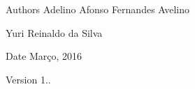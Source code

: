 \begin{DoxyAuthor}{Authors}
Adelino Afonso Fernandes Avelino 

Yuri Reinaldo da Silva 
\end{DoxyAuthor}
\begin{DoxyDate}{Date}
Março, 2016 
\end{DoxyDate}
\begin{DoxyVersion}{Version}
1.. 
\end{DoxyVersion}
